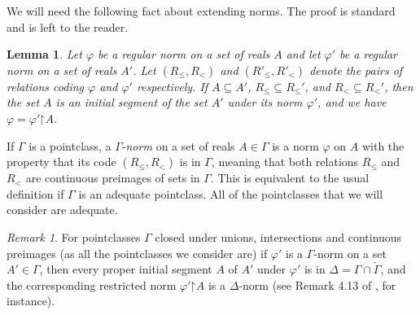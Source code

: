 \documentclass[fleqn, 11pt]{amsart}
\theoremstyle{plain}
\newtheorem{lem}[thm]{Lemma} \newtheorem*{lem*}{Lemma}
\theoremstyle{definition}
\theoremstyle{remark}
\newtheorem{rem}[thm]{Remark} \newtheorem*{rem*}{Remark}
\newcommand{\bfGamma}{\bf{\Gamma}}
\newcommand{\restrict}{\mathord{\restriction}}
\begin{document}
 We will need the following fact about extending norms.  The proof is standard and is left to the reader.
 
 \begin{lem}\label{lem-extending-norms}
  Let $\varphi$ be a regular norm on a set of reals $A$ and let $\varphi'$ be a regular norm on a set of reals $A'$.
  Let  $(R_\le, R_<)$ and $(R'_\le, R'_<)$ denote the pairs of relations coding $\varphi$ and $\varphi'$ respectively.
  If $A \subseteq A'$, $R_\le \subseteq R_\le'$, and $R_< \subseteq R_<'$,
  then the set $A$ is an initial segment of the set $A'$ under its norm $\varphi'$, and we have $\varphi = \varphi' \restrict A$.
 \end{lem}
 
%   



If $\Gamma$ is a pointclass, a $\Gamma$-\emph{norm} on a set of reals $A \in \Gamma$ is a norm $\varphi$ on $A$ with the property that its code $(R_\le,R_<)$ is in $\Gamma$, meaning that both relations $R_\le$ and $R_<$ are continuous preimages of sets in $\Gamma$. This is equivalent to the usual definition \cite[p.~153]{MosDST2009} if $\Gamma$ is an adequate pointclass.  All of the pointclasses that we will consider are adequate.

\begin{rem}\label{initsegrem}
For pointclasses $\Gamma$ closed under unions, intersections and continuous preimages (as all the pointclasses we consider are) if $\varphi'$ is a $\Gamma$-norm on a set $A' \in \Gamma$, then every proper initial segment $A$ of $A'$ under $\varphi'$ is in $\Delta = \Gamma \cap \check{\Gamma}$, and the corresponding restricted norm $\varphi' \restrict A$ is a $\Delta$-norm (see Remark 4.13 of \cite{Larson:Extensions}, for instance).
\end{rem}

\end{document}
